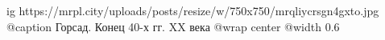 
 
 
 
 

\ifcmt
  ig https://mrpl.city/uploads/posts/resize/w/750x750/mrqliycrsgn4gxto.jpg
	@caption Горсад. Конец 40-х гг. XX века
  @wrap center
  @width 0.6
\fi
